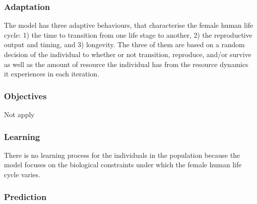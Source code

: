 \documentclass{article}
\begin{document}
\subsubsection{Adaptation}

The model has three adaptive behaviours, that characterise the female human life cycle: 1) the time to transition from one life stage to another, 2) the reproductive output and timing, and 3) longevity. The three of them are based on a random decision of the individual to whether or not transition, reproduce, and/or survive as well as the amount of resource the individual has from the resource dynamics it experiences in each iteration.

\subsubsection{Objectives}

Not apply

\subsubsection{Learning}

There is no learning process for the individuals in the population because the model focuses on the biological constraints under which the female human life cycle varies.

\subsubsection{Prediction}
\end{document}

